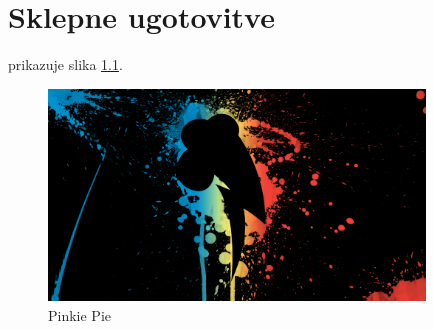 \chapter{Sklepne ugotovitve}


prikazuje slika \ref{drevo}. 

\begin{figure}
\begin{center}
\includegraphics[width=10cm]{pic/T2FnHj6.png}
\end{center}
\caption{Pinkie Pie}
\label{drevo}
\end{figure} 

